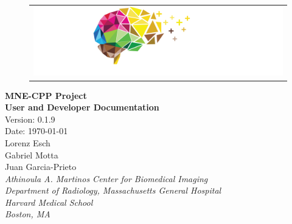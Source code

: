 \documentclass[12pt, twoside]{article}
\newcommand{\versionnumber}{0.1.9}
\begin{document}

\begin{titlepage}
\begin{figure}
\begin{tabular}{@{}l@{}}
\includegraphics[width=25cm]{mne-cpp_logo_notext.png}
\end{tabular}
\end{figure}


\begin{flushright}
\vspace{12pt}  
\vfill
\LARGE{\textbf{MNE-CPP Project}} \\

\Huge{\textbf{User and Developer Documentation}} \\
\large{Version: \versionnumber} \\
\large{Date: \today} \\
\vfill
\large Lorenz Esch \\
\large Gabriel Motta \\
\large Juan Garcia-Prieto \\
\vspace{12pt}
\textit{Athinoula A. Martinos Center for Biomedical Imaging}\\
\textit{Department of Radiology, Massachusetts General Hospital}\\
\textit{Harvard Medical School}\\
\textit{Boston, MA}
\vspace{12pt}
\vfill


\end{flushright}
\end{titlepage}
\let\cleardoublepage\clearpage


\end{document}
